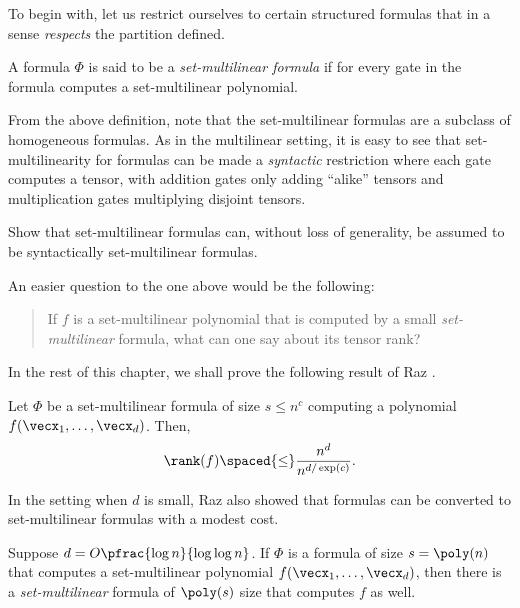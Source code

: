 To begin with, let us restrict ourselves to certain structured formulas that in a sense \emph{respects} the partition defined. 

\begin{definition} A formula $\Phi$ is said
  to be a \emph{set-multilinear formula} if for every gate in the formula computes a set-multilinear polynomial.
\end{definition}

From the above definition, note that the set-multilinear formulas are a subclass of homogeneous formulas.
As in the multilinear setting, it is easy to see that set-multilinearity for formulas can be made a \emph{syntactic} restriction where each gate computes a tensor, with addition gates only adding ``alike'' tensors and multiplication gates multiplying disjoint tensors.

\begin{exercise}
  Show that set-multilinear formulas can, without loss of generality, be assumed to be syntactically set-multilinear formulas.
\end{exercise}

\noindent
An easier question to the one above would be the following:

\begin{quote}
  If $f$ is a set-multilinear polynomial that is computed by a small \emph{set-multilinear} formula, what can one say about its tensor rank?
\end{quote}

In the rest of this chapter, we shall prove the following result of Raz \cite{raz10}. 

\begin{theorem} \label{thm:raz-tensorrank-sml} Let
  $\Phi$ be a set-multilinear formula of size $s \leq n^c$ computing a polynomial $f(\vecx_1,\ldots, \vecx_d)$.
Then,
\[
\rank(f) \spaced{\leq} \frac{n^d}{n^{d/\exp(c)}}. 
\] 
\end{theorem}

In the setting when $d$ is small, Raz \cite{raz10} also showed that formulas can be converted to set-multilinear formulas with a modest cost. 

\begin{theorem}\label{thm:form-to-smlform}
  Suppose $d = O\pfrac{\log n}{\log\log n}$.
If $\Phi$ is a formula of size $s = \poly(n)$ that computes a set-multilinear polynomial $f(\vecx_1,\ldots, \vecx_d)$, then there is a \emph{set-multilinear} formula of $\poly(s)$ size that computes $f$ as well.
\end{theorem}

